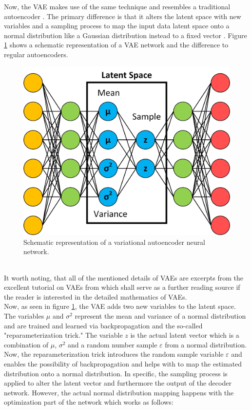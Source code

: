\documentclass[MGS,Master,english]{twbook}%
\begin{document}
Now, the \ac{VAE} makes use of the same technique and resembles a traditional autoencoder \cite{ml::vae::tutorial}. The primary difference is that it alters the latent space with new variables and a sampling process to map the input data latent space onto a normal distribution like a Gaussian distribution instead to a fixed vector \cite{ml::vae::tutorial}. Figure \ref{fig::vae} shows a schematic representation of a VAE network and the difference to regular autoencoders. 
\begin{figure}[!htbp]
	\centering
	\includegraphics[width=0.65\linewidth]{PICs/NNs/variational_autoencoder}
	\caption{Schematic representation of a variational autoencoder neural network.} \label{fig::vae}
\end{figure}\\
It worth noting, that all of the mentioned details of VAEs are excerpts from the excellent tutorial on VAEs from \citep{ml::vae::tutorial} which shall serve as a further reading source if the reader is interested in the detailed mathematics of VAEs.\\
Now, as seen in figure \ref{fig::vae}, the VAE adds two new variables to the latent space. The variables $\mu$ and $\sigma^{2}$ represent the mean and variance of a normal distribution and are trained and learned via backpropagation and the so-called "reparameterization trick." The variable $z$ is the actual latent vector which is a combination of $\mu$, $\sigma^{2}$ and a random number sample $\varepsilon$ from a normal distribution. Now, the reparameterization trick introduces the random sample variable $\varepsilon$ and enables the possibility of backpropagation and helps with to map the estimated distribution onto a normal distribution. In specific, the sampling process is applied to alter the latent vector and furthermore the output of the decoder network. However, the actual normal distribution mapping happens with the optimization part of the network which works as follows:
\end{document}
